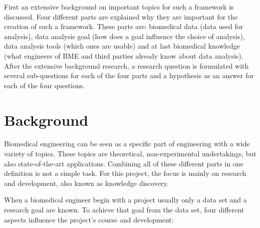 \documentclass[10pt,a4paper]{article}
\begin{document}
	First an extensive background on important topics for such a framework is discussed. Four different parts are explained why they are important for the creation of such a framework. These parts are: biomedical data (data used for analysis), data analysis goal (how does a goal influence the choice of analysis), data analysis tools (which ones are usable) and at last biomedical knowledge (what engineers of BME and third parties already know about data analysis). After the extensive background research, a research question is formulated with several sub-questions for each of the four parts and a hypothesis as an answer for each of the four questions.
	
	\section{Background}
	\label{sec:Background}
	
	Biomedical engineering can be seen as a specific part of engineering with a wide variety of topics. These topics are theoretical, non-experimental undertakings, but also state-of-the-art applications. Combining all of these different parts in one definition is not a simple task\cite{bronzino2014biomedical}. For this project, the focus is mainly on research and development, also known as knowledge discovery\cite{bramer2007principles}.
	
	When a biomedical engineer begin with a project usually only a data set and a research goal are known. To achieve that goal from the data set, four different aspects influence the project's course and development:
	
\end{document}
